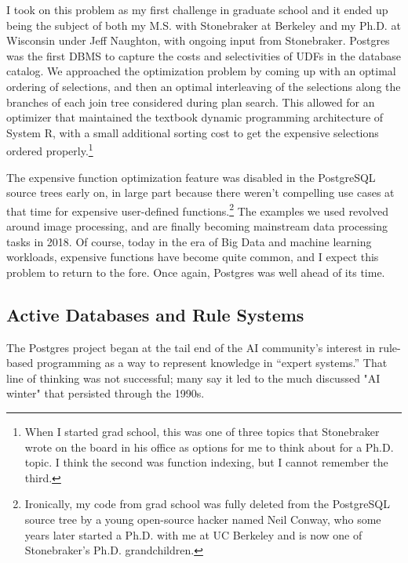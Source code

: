 \documentclass[sigconf,natbib=false]{acmart}
\begin{document}
I took on this problem as my first challenge in graduate school and it ended up being the subject of both my M.S. with Stonebraker at Berkeley and my Ph.D. at Wisconsin under Jeff Naughton, with ongoing input from Stonebraker. Postgres was the first DBMS to capture the costs and selectivities of UDFs in the database catalog. We approached the optimization problem by coming up with an optimal ordering of selections, and then an optimal interleaving of the selections along the branches of each join tree considered during plan search. This allowed for an optimizer that maintained the textbook dynamic programming architecture of System R, with a small additional sorting cost to get the expensive selections ordered properly.\footnote{When I started grad school, this was one of three topics that Stonebraker wrote on the board in his office as options for me to think about for a Ph.D. topic. I think the second was function indexing, but I cannot remember the third. }



The expensive function optimization feature was disabled in the PostgreSQL source trees early on, in large part because there weren't compelling use cases at that time for expensive user-defined functions.\footnote{Ironically, my code from grad school was fully deleted from the PostgreSQL source tree by a young open-source hacker named Neil Conway, who some years later started a Ph.D. with me at UC Berkeley and is now one of Stonebraker's Ph.D. grandchildren.} The examples we used revolved around image processing, and are finally becoming mainstream data processing tasks in 2018. Of course, today in the era of Big Data and machine learning workloads, expensive functions have become quite common, and I expect this problem to return to the fore. Once again, Postgres was well ahead of its time.

\subsection{Active Databases and Rule Systems}

The Postgres project began at the tail end of the AI community's interest in rule-based programming as a way to represent knowledge in ``expert systems.'' That line of thinking was not successful; many say it led to the much discussed "AI winter" that persisted through the 1990s. 
\end{document}
